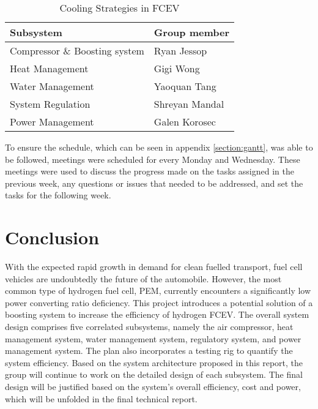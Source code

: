 \documentclass[a4paper,11pt]{article}
\begin{document}
\begin{table}[h!]
    \centering
    \begin{tabular}{|l|l|}%
    \hline
    \textbf{Subsystem} & \textbf{Group member} \\ [0.5ex] 
    \hline
    Compressor \& Boosting system & Ryan Jessop \\
    Heat Management & Gigi Wong \\
    Water Management & Yaoquan Tang \\
    System Regulation & Shreyan Mandal \\
    Power Management & Galen Korosec \\
    \hline
    \end{tabular}
    \caption{Cooling Strategies in FCEV}
    \label{tab:subsystemDependencies}
\end{table}

To ensure the schedule, which can be seen in appendix \ref{section:gantt}, was able to be followed, meetings were scheduled for every Monday and Wednesday. These meetings were used to discuss the progress made on the tasks assigned in the previous week, any questions or issues that needed to be addressed, and set the tasks for the following week.

\section{Conclusion}
With the expected rapid growth in demand for clean fuelled transport, fuel cell vehicles are undoubtedly the future of the automobile. However, the most common type of hydrogen fuel cell, PEM, currently encounters a significantly low power converting ratio deficiency. This project introduces a potential solution of a boosting system to increase the efficiency of hydrogen FCEV. The overall system design comprises five correlated subsystems, namely the air compressor, heat management system, water management system, regulatory system, and power management system. The plan also incorporates a testing rig to quantify the system efficiency.
Based on the system architecture proposed in this report, the group will continue to work on the detailed design of each subsystem. The final design will be justified based on the system's overall efficiency, cost and power, which will be unfolded in the final technical report.


\newpage

\end{document}
